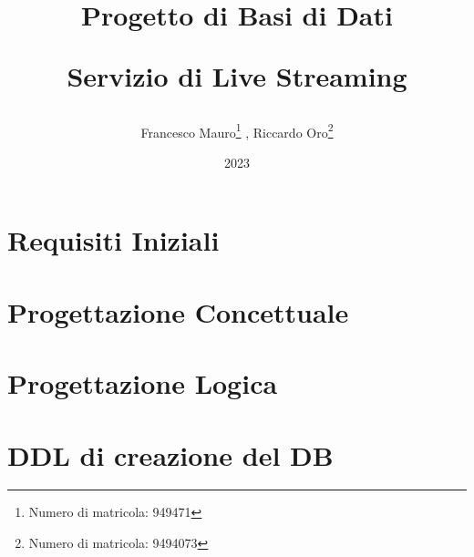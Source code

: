\documentclass[letterpaper]{report}
\title{ Progetto di Basi di Dati \newline \begin{center}
  \textbf{Servizio di Live Streaming}
\end{center}}
\author{Francesco Mauro\footnote{Numero di matricola: 949471} , Riccardo Oro\footnote{Numero di matricola: 9494073}}
\date{2023}
\begin{document}
\maketitle
\tableofcontents

\chapter{Requisiti Iniziali}


\chapter{Progettazione Concettuale}




\chapter{Progettazione Logica}



\chapter{DDL di creazione del DB}

\end{document}
